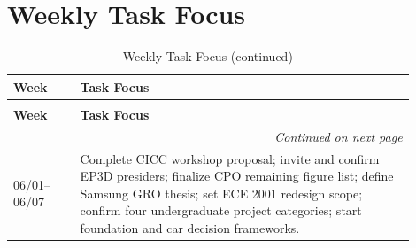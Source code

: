\documentclass[custom, sidenote, final]{cls/oneproposal}
\begin{document}
\newpage
\section{Weekly Task Focus}

\begingroup
\footnotesize
\setlength{\LTleft}{0pt}
\setlength{\LTright}{0pt}

\begin{longtable}{m{0.15\linewidth} p{0.75\linewidth}}
    \caption{Weekly Task Focus}\label{tab:weekly-focus}                                                                                                                                                                                                                \\
    \toprule
    \textbf{Week} & \textbf{Task Focus}                                                                                                                                                                                                                                \\
    \midrule
    \endfirsthead

    \caption[]{Weekly Task Focus (continued)}                                                                                                                                                                                                                          \\
    \toprule
    \textbf{Week} & \textbf{Task Focus}                                                                                                                                                                                                                                \\
    \midrule
    \endhead

    \midrule
    \multicolumn{2}{r}{\textit{Continued on next page}}                                                                                                                                                                                                                \\
    \endfoot

    \bottomrule
    \endlastfoot

    06/01--06/07  &
    Complete CICC workshop proposal; invite and confirm EP3D presiders; finalize CPO remaining figure list; define Samsung GRO thesis; set ECE 2001 redesign scope; confirm four undergraduate project categories; start foundation and car decision frameworks.       \\
    \midrule


\end{longtable}
\end{document}

